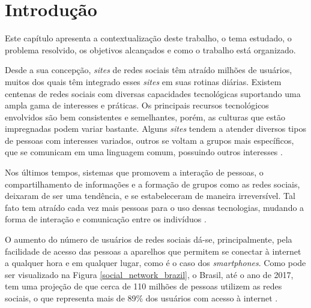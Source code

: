 \chapter{Introdução}

Este capítulo apresenta a contextualização deste trabalho, o tema estudado, o problema resolvido, os objetivos alcançados e como o trabalho está organizado.

Desde a sua concepção, \textit{sites} de redes sociais têm atraído milhões de usuários, muitos dos quais têm integrado esses \textit{sites} em suas rotinas diárias. Existem centenas de redes sociais com diversas capacidades tecnológicas suportando uma ampla gama de interesses e práticas. Os principais recursos tecnológicos envolvidos são bem consistentes e semelhantes, porém, as culturas que estão impregnadas podem variar bastante. Alguns \textit{sites} tendem a atender diversos tipos de pessoas com interesses variados, outros se voltam a grupos mais específicos, que se comunicam em uma linguagem comum, possuindo outros interesses \cite{Boyd:Ellison:2007}.

Nos últimos tempos, sistemas que promovem a interação de pessoas, o compartilhamento de informações e a formação de grupos como as redes sociais, deixaram de ser uma tendência, e se estabeleceram de maneira irreversível. Tal fato tem atraído cada vez mais pessoas para o uso dessas tecnologias, mudando a forma de interação e comunicação entre os indivíduos \cite{Santana:Melo-Solarte:Neris:Miranda:Baranauskas:2009}.

O aumento do número de usuários de redes sociais dá-se, principalmente, pela facilidade de acesso das pessoas a aparelhos que permitem se conectar à internet a qualquer hora e em qualquer lugar, como é o caso dos \textit{smartphones}. Como pode ser visualizado na Figura \ref{social_network_brazil}, o Brasil, até o ano de 2017, tem uma projeção de que cerca de 110 milhões de pessoas utilizem as redes sociais, o que representa mais de 89\% dos usuários com acesso à internet \cite{eMarketer:2013}.

\newpage

